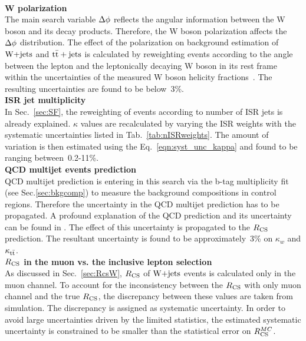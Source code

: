 \\
\textbf{W polarization}\\
The main search variable $\Delta \phi$ reflects the angular information between the W boson and its decay products. Therefore, the W boson polarization affects the $\Delta \phi$ distribution. The effect of the polarization on background estimation of $\textrm{W+jets}$ and ${\rm t\bar{t}+jets}$ is calculated by reweighting events according to the angle between the lepton and the leptonically decaying W boson in its rest frame within the uncertainties of the measured W boson helicity fractions~\cite{Wpol1,Wpol2}. The resulting  uncertainties are found to be below~3\%.
\\
\textbf{ISR jet multiplicity}\\
In Sec.~\ref{sec:SF}, the reweighting of events according to number of ISR jets is already explained. $\kappa$ values are recalculated by varying the ISR weights with the systematic uncertainties listed in Tab.~\ref{tab:nISRweights}. The amount of variation is then estimated using the Eq.~\ref{eqn:syst_unc_kappa} and found to be ranging between~0.2-11\%.\\
\textbf{QCD multijet events prediction}\\
QCD multijet prediction is entering in this search via the b-tag multiplicity fit (see Sec.\ref{sec:bkgcomp}) to measure the background compositions in control regions. Therefore the uncertainty in the QCD multijet prediction has to be propagated. A profound explanation of the QCD prediction and its uncertainty can be found in \cite{David}. The effect of this uncertainty is propagated to the $R_{\rm CS}$ prediction. The resultant uncertainty is found to be approximately~3\% on $\kappa_w$ and $\kappa_{\rm t\bar{t}}$.\\
\textbf{$R_{\rm CS}$ in the muon vs. the inclusive lepton selection}\\
As discussed in Sec.~\ref{sec:RcsW}, $R_{\rm CS}$ of $\textrm{W+jets}$ events is calculated only in the muon channel. To account for the inconsistency between the $R_{\rm CS}$ with only muon channel and the true $R_{\rm CS}$, the discrepancy between these values are taken from simulation. The discrepancy is assigned as systematic uncertainty. In order to avoid large uncertainties driven by the limited statistics, the estimated systematic uncertainty is constrained to be smaller than the statistical error on $R_{\rm CS}^{MC}$. \\
